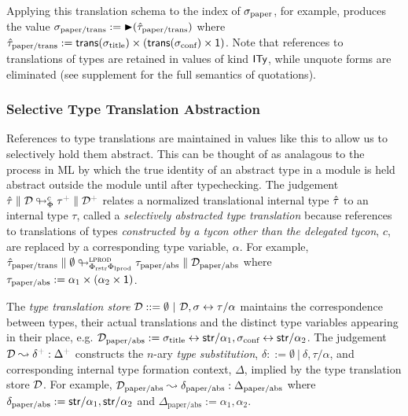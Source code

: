 \documentclass[pldi]{sigplanconf-pldi15}
\newcommand{\moutput}{^{\color{gray}+}}
\begin{document}
Applying this translation schema to the index of $\sigma_\text{paper}$, for example, produces the value  $\sigma_\text{paper/trans} := {\blacktriangleright}(\hat{\tau}_\text{paper/trans})$ where $\small\qity_\text{paper/trans} := \srep{\stx{title}}\times(\srep{\stx{conf}}\times \iunit)$. Note  that references to translations of types are retained in values of kind ${\sf ITy}$, while unquote forms are eliminated (see supplement for the full semantics of quotations).%


\noindent
\subsubsection{Selective Type Translation Abstraction}\label{sec:selective-type-translation-abstraction}
\noindent
References to type translations are maintained in values like this to  allow us to selectively hold them abstract. This can be thought of as analagous to the process in ML by which the true identity of an abstract type in a module is held abstract outside the module until after typechecking. The judgement $\small\tdeabs{\Phi}{c}{\qity}{\memD}{\ity\moutput}{\memD\moutput}$ relates a normalized translational internal type $\hat{\tau}$ to an internal type $\tau$, called a \emph{selectively abstracted type translation} because references to translations of types \emph{constructed by a tycon other than the delegated tycon}, $c$, are replaced by a corresponding type variable, $\alpha$. For example, $\small\tdeabs{\Phi_\text{rstr}\Phi_\text{lprod}}{\tcvar{lprod}}{\qity_\text{paper/trans}}{\emptyset}{\tau_\text{paper/abs}}{\memD_\text{paper/abs}}$
where $\small\tau_\text{paper/abs} := \alpha_1 \times (\alpha_2 \times \iunit)$. 

The \emph{type translation store} $\mathcal{D} ::= \emptyset ~|~ \mathcal{D}, \sigma \leftrightarrow \tau/\alpha$ maintains the correspondence between types, their actual translations and the distinct type variables appearing in their place,  e.g. 
$\mathcal{D}_\text{paper/abs}  := \sigma_\text{title} \leftrightarrow {\sf str}/\alpha_1, \sigma_\text{conf} \leftrightarrow {\sf str}/\alpha_2$. The judgement $\memD \leadsto \delta\moutput : \Delta\moutput$ constructs the $n$-ary \emph{type substitution}, $\delta ::= \emptyset ~|~ \delta, \tau/\alpha$, and corresponding internal type formation context, $\Delta$, implied by the type translation store $\mathcal{D}$. For example, $\mathcal{D}_\text{paper/abs} \leadsto \delta_\text{paper/abs} : \Delta_\text{paper/abs}$ where $\delta_\text{paper/abs} := {\sf str}/\alpha_1, {\sf str}/\alpha_2$ and $\Delta_\text{paper/abs} := \alpha_1, \alpha_2$. 
\end{document}
